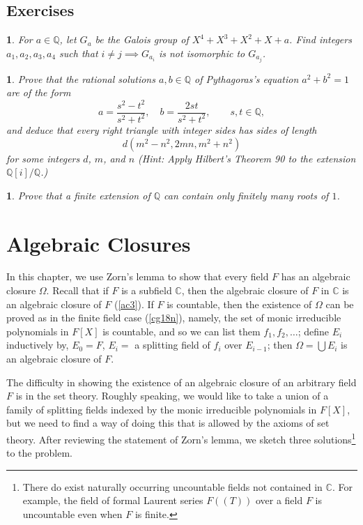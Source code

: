 \documentclass[a4paper,11pt,final,openany]{memoir}
\newtheorem{exercise}[Y]{}
\theoremstyle{nonumberplain}
\begin{document}
\section{Exercises}

\begin{exercise}
\label{x21} For $a\in{\mathbb{Q}}$, let $G_{a}$ be the Galois group of
$X^{4}+X^{3}+X^{2}+X+a$. Find integers $a_{1},a_{2},a_{3},a_{4}$ such that
$i\neq j\implies G_{a_{i}}$ is not isomorphic to $G_{a_{j}}$.
\end{exercise}

\begin{exercise}
\label{x22} Prove that the rational solutions $a,b\in{\mathbb{Q}}$ of
Pythagoras's equation $a^{2}+b^{2}=1$ are of the form
\[
a=\frac{s^{2}-t^{2}}{s^{2}+t^{2}},\quad b=\frac{2st}{s^{2}+t^{2}},\qquad
s,t\in{\mathbb{Q}},
\]
and deduce that every right triangle with integer sides has sides of length
\[
d(m^{2}-n^{2},2mn,m^{2}+n^{2})
\]
for some integers $d$, $m$, and $n$ (Hint: Apply Hilbert's Theorem 90 to the
extension ${\mathbb{Q}}[i]/{\mathbb{Q}}$.)
\end{exercise}

\begin{exercise}
\label{x23} Prove that a finite extension of ${\mathbb{Q}}$ can contain only
finitely many roots of $1$.
\end{exercise}

\clearpage


\chapter{Algebraic Closures}

In this chapter, we use Zorn's lemma to show that every field $F$ has an
algebraic closure $\Omega$. Recall that if $F$ is a subfield $\mathbb{C}{}$,
then the algebraic closure of $F$ in $\mathbb{C}{}$ is an algebraic closure of
$F$ (\ref{ac3}). If $F$ is countable, then the existence of $\Omega$ can be
proved as in the finite field case (\ref{cg18n}), namely, the set of monic
irreducible polynomials in $F[X]$ is countable, and so we can list them
$f_{1},f_{2},\ldots$; define $E_{i}$ inductively by, $E_{0}=F$, $E_{i}=$ a
splitting field of $f_{i}$ over $E_{i-1}$; then $\Omega=\bigcup E_{i}$ is an
algebraic closure of $F$.

The difficulty in showing the existence of an algebraic closure of an
arbitrary field $F$ is in the set theory. Roughly speaking, we would like to
take a union of a family of splitting fields indexed by the monic irreducible
polynomials in $F[X]$, but we need to find a way of doing this that is allowed
by the axioms of set theory. After reviewing the statement of Zorn's lemma, we
sketch three solutions\footnote{There do exist naturally occurring uncountable
fields not contained in $\mathbb{C}$. For example, the field of formal Laurent
series $F((T))$ over a field $F$ is uncountable even when $F$ is finite.} to
the problem.
\end{document}
